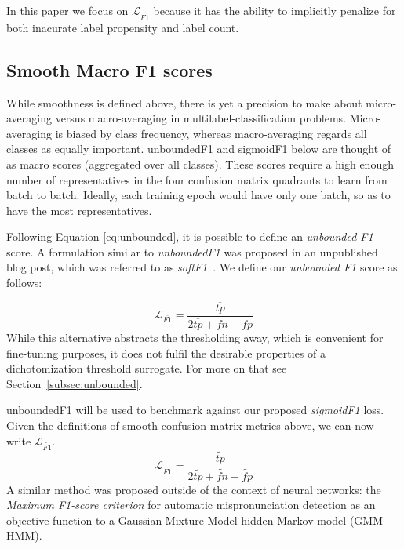 In this paper we focus on $\mathcal{L}_{\widetilde{\mathit{F1}}}$ because it has the ability to implicitly penalize for both inacurate label propensity and label count.


\subsection{Smooth Macro F1 scores}
\label{sec:orgc5d29d7}

While smoothness is defined above, there is yet a precision to make about micro-averaging versus macro-averaging in multilabel-classification problems. Micro-averaging is biased by class frequency, whereas macro-averaging regards all classes as equally important. unboundedF1 and sigmoidF1 below are thought of as macro scores (aggregated over all classes). These scores require a high enough number of representatives in the four confusion matrix quadrants to learn from batch to batch. Ideally, each training epoch would have only one batch, so as to have the most representatives.

Following Equation \ref{eq:unbounded}, it is possible to define an \emph{unbounded F1} score. A formulation similar to \emph{unboundedF1} was proposed in an unpublished blog post, which was referred to as \emph{softF1}~\cite{softF1}. We define our \emph{unbounded F1} score as follows:

%
\begin{equation}
\mathcal{L}_{\overline{\mathit{F1}}}= \frac{\overline{tp}}{2 \overline{tp}+ \overline{fn}+ \overline{fp}}
\end{equation}
%
While this alternative abstracts the thresholding away, which is convenient for fine-tuning purposes, it does not fulfil the desirable properties of a dichotomization threshold surrogate. For more on that see Section~\ref{subsec:unbounded}.

unboundedF1 will be used to benchmark against our proposed \emph{sigmoidF1} loss. Given the definitions of smooth confusion matrix metrics above, we can now write $\mathcal{L}_{\widetilde{\mathit{F1}}}$.
%
\begin{equation}\label{eq:sigmoidF1}
\mathcal{L}_{\widetilde{\mathit{F1}}}= \frac{\widetilde{\mathit{tp}}}{2 \widetilde{\mathit{tp}}+ \widetilde{\mathit{fn}}+ \widetilde{\mathit{fp}}}
\end{equation}
%
A similar method was proposed outside of the context of neural networks: the \emph{Maximum F1-score criterion} for automatic mispronunciation detection as an objective function to a Gaussian Mixture Model-hidden Markov model (GMM-HMM)\cite{sigmoid}.


